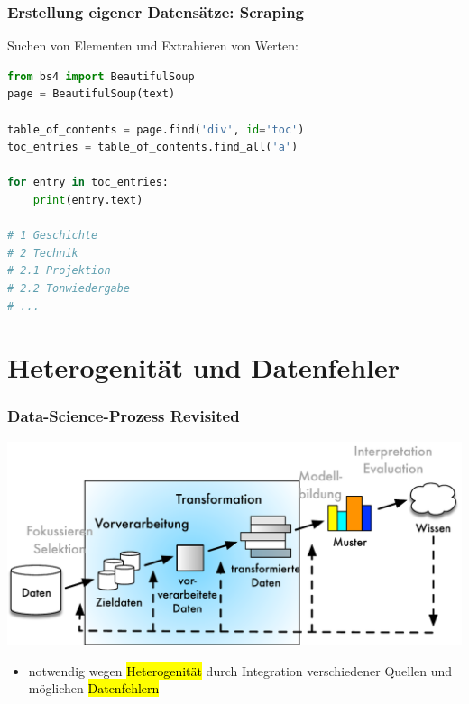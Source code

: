 \begin{frame}[fragile]
\frametitle{Erstellung eigener Datensätze: Scraping}

Suchen von Elementen und Extrahieren von Werten:

\begin{lstlisting}[language=Python]
from bs4 import BeautifulSoup
page = BeautifulSoup(text)

table_of_contents = page.find('div', id='toc')
toc_entries = table_of_contents.find_all('a')

for entry in toc_entries:
    print(entry.text)

# 1 Geschichte
# 2 Technik
# 2.1 Projektion
# 2.2 Tonwiedergabe
# ...\end{lstlisting}
\end{frame}


\section{Heterogenität und Datenfehler}



\begin{frame}
    \frametitle{Data-Science-Prozess Revisited}
    
    \begin{center}
    \includegraphics[scale=.6]{fig4/kdd-prozess.pdf}
    \end{center}
    
    \begin{itemize}
    \item notwendig wegen \hl{Heterogenität} durch Integration
      verschiedener Quellen und möglichen \hl{Datenfehlern}
    \end{itemize}
    
\end{frame}
    
